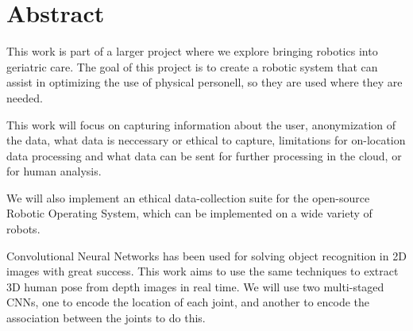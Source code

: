 \chapter*{Abstract}


This work is part of a larger project where we explore bringing robotics into geriatric
care. The goal of this project is to create a robotic system that can assist in optimizing
the use of physical personell, so they are used where they are needed.

This work will focus on capturing information about the user, anonymization of the data,
what data is neccessary or ethical to capture, limitations for on-location data processing
and what data can be sent for further processing in the cloud, or for human analysis.

We will also implement an ethical data-collection suite for the open-source Robotic
Operating System, which can be implemented on a wide variety of robots.

Convolutional Neural Networks has been used for solving object recognition in 2D images
with great success. This work aims to use the same techniques to extract 3D human pose
from depth images in real time. We will use two multi-staged CNNs, one to encode the
location of each joint, and another to encode the association between the joints to do this.




